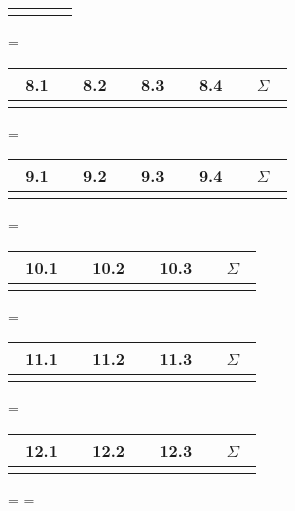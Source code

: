 \documentclass[twoside]{article}
\begin{document}
\begin{center}
\begin{tabular}{c|c|c|c}
		 &	   &	 &
	\end{tabular}
	\fi
	\ifnum\ZettelAcht=\True
	\begin{tabular}{c|c|c|c|c}
	~8.1~&~8.2~&~8.3~&~8.4~&~$\Sigma$~	\\	\hline
		 &	   &	  &		&
	\end{tabular}
	\fi
	\ifnum\ZettelNeun=\True
	\begin{tabular}{c|c|c|c|c}
	~9.1~&~9.2~&~9.3~&~9.4~&~$\Sigma$~	\\	\hline
		 &	   &	 &		&
	\end{tabular}
	\fi
	\ifnum\ZettelZehn=\True
	\begin{tabular}{c|c|c|c}
	~10.1~&~10.2~&~10.3~&~$\Sigma$~	\\	\hline
		 &	   &	 &
	\end{tabular}
	\fi
	\ifnum\ZettelElf=\True
	\begin{tabular}{c|c|c|c}
	~11.1~&~11.2~&~11.3~&~$\Sigma$~	\\	\hline
		 &	   &	 &
	\end{tabular}
	\fi
	\ifnum\ZettelZwoelf=\True
	\begin{tabular}{c|c|c|c}
	~12.1~&~12.2~&~12.3~&~$\Sigma$~	\\	\hline
		 &	   &	 &
	\end{tabular}
	\fi
	\fi
	
\end{center}
\newpage
\fi



\ifnum\Empty=\True
\leereSeite
\fi
\ifnum\TOC=\True
\pagestyle{empty}
\tableofcontents
\newpage
\fi
\pagestyle{fancy}
\end{document}
